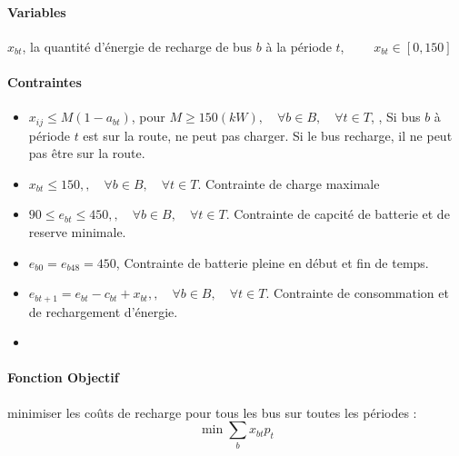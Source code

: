\documentclass{article}
\begin{document}
\paragraph{Variables}
$x_{bt}$, la quantité d'énergie de recharge de bus $b$ à la période $t$, $\qquad x_{bt}\in [0,150]$

\paragraph{Contraintes}
\begin{itemize}
    \item $x_{ij} \leq M(1-a_{bt})$, pour $M \geq 150 (kW), \quad \forall b \in B, \quad \forall t \in T$, , Si bus $b$ à période $t$ est sur la route, ne peut pas charger. Si le bus recharge, il ne peut pas être sur la route. 
    \item $x_{bt} \leq 150, , \quad \forall b \in B, \quad \forall t \in T$. Contrainte de charge maximale
    \item $ 90 \leq e_{bt} \leq 450, , \quad \forall b \in B, \quad \forall t \in T$. Contrainte de capcité de batterie et de reserve minimale. 
    \item $e_{b0}=e_{b48}=450$, Contrainte de batterie pleine en début et fin de temps.
    \item $e_{bt+1} = e_{bt} - c_{bt} + x_{bt}, , \quad \forall b \in B, \quad \forall t \in T$. Contrainte de consommation et de rechargement d'énergie. 
    \item 
\end{itemize}

\paragraph{Fonction Objectif}
minimiser les coûts de recharge pour tous les bus sur toutes les périodes : 
$$\min \sum_{b} x_{bt}p_t$$
\end{document}
